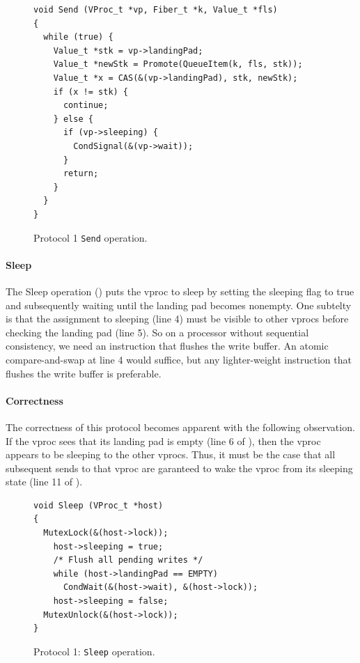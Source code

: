 \documentclass[11pt]{article}
\begin{document}
\begin{figure}
\lstset{language=C}
\lstset{commentstyle=\textit}
\lstset{numbers=left}
\begin{lstlisting}
void Send (VProc_t *vp, Fiber_t *k, Value_t *fls)
{
  while (true) {
    Value_t *stk = vp->landingPad;
    Value_t *newStk = Promote(QueueItem(k, fls, stk));
    Value_t *x = CAS(&(vp->landingPad), stk, newStk);
    if (x != stk) {
      continue;
    } else {
      if (vp->sleeping) {
        CondSignal(&(vp->wait));
      }
      return;
    }
  }
}
\end{lstlisting}
\caption{Protocol 1 \texttt{Send} operation.}\label{fig:protocol1-send}
\end{figure}

\paragraph{Sleep}
The Sleep operation () puts the vproc to sleep by 
setting the sleeping flag to true and subsequently waiting until the landing
pad becomes nonempty.
One subtelty is that the assignment to sleeping (line 4) must be visible
to other vprocs before checking the landing pad (line 5).
So on a processor without sequential consistency, we need an instruction that flushes 
the write buffer.
An atomic compare-and-swap at line 4 would suffice, but any lighter-weight instruction
that flushes the write buffer is preferable.

\paragraph{Correctness}
The correctness of this protocol becomes apparent with the following observation.
If the vproc sees that its landing pad is empty (line 6 of ), 
then the vproc appears to be sleeping to the other vprocs.
Thus, it must be the case that all subsequent sends to that vproc are garanteed to
wake the vproc from its sleeping state (line 11 of ).

\begin{figure}
\lstset{language=C}
\lstset{commentstyle=\textit}
\lstset{numbers=left}
\begin{lstlisting}
void Sleep (VProc_t *host)
{
  MutexLock(&(host->lock));
    host->sleeping = true;
    /* Flush all pending writes */
    while (host->landingPad == EMPTY)
      CondWait(&(host->wait), &(host->lock));
    host->sleeping = false;
  MutexUnlock(&(host->lock));
}
\end{lstlisting}
\caption{Protocol 1: \texttt{Sleep} operation.}\label{fig:protocol1-sleep}
\end{figure}
\end{document}
